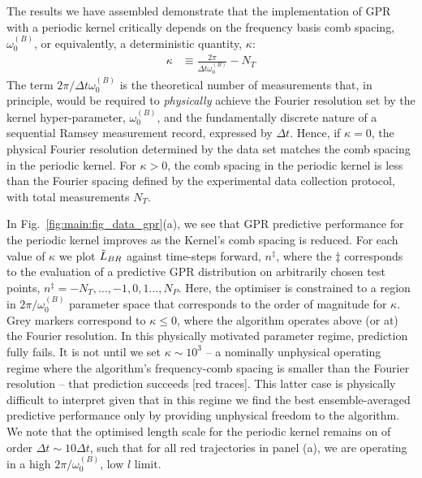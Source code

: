 The results we have assembled demonstrate that the implementation of GPR with a periodic kernel critically depends on the frequency basis comb spacing, $\omega_0^{(B)}$, or equivalently, a deterministic quantity, $\kappa$:
\begin{align}
	\kappa & \equiv \frac{2\pi}{\Delta t \omega_0^{(B)}} - N_T 
\end{align}
The term $ 2\pi /  \Delta t \omega_0^{(B)}$ is the theoretical number of measurements that, in principle, would be required to \emph{physically} achieve the Fourier resolution set by the kernel hyper-parameter, $\omega_0^{(B)}$, and the fundamentally discrete nature of a sequential Ramsey measurement record, expressed by $\Delta t$. Hence, if $\kappa = 0$, the physical Fourier resolution determined by the data set matches the comb spacing in the periodic kernel. For $\kappa > 0$, the comb spacing in the periodic kernel is less than the Fourier spacing defined by the experimental data collection protocol, with total measurements $N_T$. 

In Fig.~\ref{fig:main:fig_data_gpr}(a), we see that GPR predictive performance for the periodic kernel improves as the Kernel's comb spacing is reduced. For each value of $\kappa$ we plot $\tilde{L}_{BR}$ against time-steps forward, $n^\ddagger$, where the $\ddagger$ corresponds to the evaluation of a predictive GPR distribution on arbitrarily chosen test points, $n^\ddagger = -N_T, \hdots, -1, 0, 1 \hdots, N_P$. Here, the optimiser is constrained to a region in $2\pi/ \omega_0^{(B)}$ parameter space that corresponds to the order of magnitude for $\kappa$. Grey markers correspond to $\kappa \leq 0$, where the algorithm operates above (or at) the Fourier resolution.  In this physically motivated parameter regime, prediction fully fails.  It is not until we set $\kappa\sim10^{3}$ -- a nominally unphysical operating regime where the algorithm's frequency-comb spacing is smaller than the Fourier resolution -- that prediction succeeds [red traces]. This latter case is physically difficult to interpret given that in this regime we find the best ensemble-averaged predictive performance only by providing unphysical freedom to the algorithm.  We note that the optimised length scale for the periodic kernel remains on of order $ \Delta t \sim 10 \Delta t$, such that for all red trajectories in panel (a), we are operating in a high $2\pi/ \omega_0^{(B)}$, low $l$ limit. 


